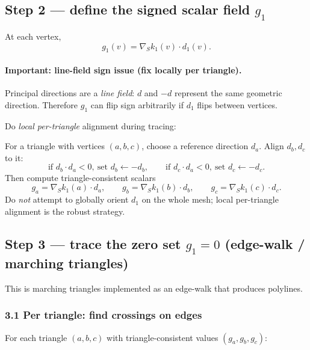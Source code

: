 \documentclass[12pt,a4paper]{article}
\theoremstyle{plain}
\theoremstyle{definition}      %
\begin{document}
	
	\subsection*{Step 2 — define the signed scalar field $g_1$}
	
	At each vertex,
	\[
	g_1(v)=\nabla_S k_1(v)\cdot d_1(v).
	\]
	
	\paragraph{Important: line-field sign issue (fix locally per triangle).}
	Principal directions are a \emph{line field}:
	$d$ and $-d$ represent the same geometric direction. Therefore $g_1$ can flip sign arbitrarily
	if $d_1$ flips between vertices.
	
	Do \emph{local per-triangle} alignment during tracing:
	
	For a triangle with vertices $(a,b,c)$, choose a reference direction $d_a$.
	Align $d_b,d_c$ to it:
	\[
	\text{if } d_b\cdot d_a<0,\ \text{set } d_b\leftarrow -d_b,
	\qquad
	\text{if } d_c\cdot d_a<0,\ \text{set } d_c\leftarrow -d_c.
	\]
	Then compute triangle-consistent scalars
	\[
	g_a=\nabla_S k_1(a)\cdot d_a,\qquad
	g_b=\nabla_S k_1(b)\cdot d_b,\qquad
	g_c=\nabla_S k_1(c)\cdot d_c.
	\]
	Do \emph{not} attempt to globally orient $d_1$ on the whole mesh; local per-triangle alignment
	is the robust strategy.
	
	
	\subsection*{Step 3 — trace the zero set $g_1=0$ (edge-walk / marching triangles)}
	
	This is marching triangles implemented as an edge-walk that produces polylines.
	
	\subsubsection*{3.1 Per triangle: find crossings on edges}
	
	For each triangle $(a,b,c)$ with triangle-consistent values $(g_a,g_b,g_c)$:
	
\end{document}
